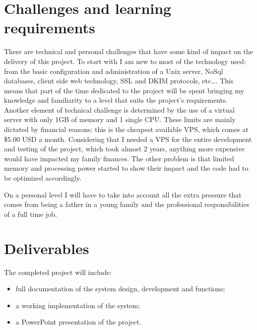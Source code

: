 \section{Challenges and learning requirements}
There are technical and personal challenges that have some kind of impact
on the delivery of this project. To start with I am new to most of the
technology used: from the basic configuration and administration of a Unix
server, NoSql databases, client side web technology, SSL and DKIM protocols,
etc\ldots. This means that part of the time dedicated to the project will be
spent bringing my knowledge and familiarity to a level that suits the project's
requirements. Another element of technical challenge is determined by the use of
a virtual server with only 1GB of memory and 1 single CPU. These limits are
mainly dictated by financial reasons: this is the cheapest available VPS, which
comes at \$5.00 USD a month. Considering that I needed a VPS for the entire
development and testing of the project, which took almost 2 years, anything more
expensive would have impacted my family finances. The other problem is that
limited memory and processing power started to show their impact and the code
had to be optimized accordingly.

On a personal level I will have to take into account all the extra pressure
that comes from being a father in a young family and the professional
responsibilities of a full time job.


\section{Deliverables}
The completed project will include:

\begin{itemize}
  \item full documentation of the system design, development and functions;
  \item a working implementation of the system;
  \item a PowerPoint presentation of the project.
\end{itemize}

